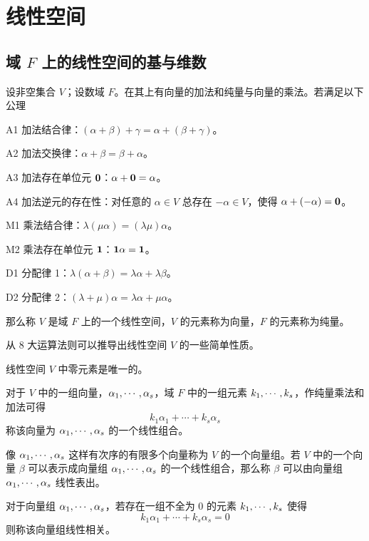 \chapter{线性空间}

\section{\texorpdfstring{域 $F$ 上的线性空间的基与维数}{域 F 上的线性空间的基与维数}}

\begin{definition}[线性空间]
	设非空集合 $V$；设数域 $F$。在其上有向量的加法和纯量与向量的乘法。若满足以下公理
	
	A1 加法结合律：$(\alpha+\beta) + \gamma = \alpha +(\beta+\gamma)$。
	
	A2 加法交换律：$\alpha + \beta = \beta + \alpha$。
	
	A3 加法存在单位元 $\boldsymbol{0}$：$\alpha + \boldsymbol{0} = \alpha$。
	
	A4 加法逆元的存在性：对任意的 $\alpha \in V$ 总存在 $-\alpha\in V$，使得 $\alpha + (-\alpha) = \boldsymbol{0}$。
	
	M1 乘法结合律：$\lambda(\mu \alpha) = (\lambda \mu) \alpha$。
	
	M2 乘法存在单位元 $\boldsymbol{1}$：$\boldsymbol{1} \alpha = \boldsymbol{1}$。
	
	D1 分配律 1：$\lambda(\alpha+\beta) = \lambda \alpha + \lambda \beta$。
	
	D2 分配律 2：$(\lambda + \mu)\alpha = \lambda \alpha + \mu \alpha$。
	
	那么称 $V$ 是域 $F$ 上的一个线性空间，$V$ 的元素称为向量，$F$ 的元素称为纯量。
\end{definition}

从 $8$ 大运算法则可以推导出线性空间 $V$ 的一些简单性质。

\begin{theorem}
	线性空间 $V$ 中零元素是唯一的。
\end{theorem}

对于 $V$ 中的一组向量，$\alpha_1,\cdots,\alpha_s$，域 $F$ 中的一组元素 $k_1,\cdots,k_s$，作纯量乘法和加法可得
\[ k_1\alpha_1+\cdots+k_s\alpha_s \]
称该向量为 $\alpha_1,\cdots,\alpha_s$ 的一个线性组合。

像 $\alpha_1,\cdots,\alpha_s$ 这样有次序的有限多个向量称为 $V$ 的一个向量组。若 $V$ 中的一个向量 $\beta$ 可以表示成向量组 $\alpha_1,\cdots,\alpha_s$ 的一个线性组合，那么称 $\beta$ 可以由向量组 $\alpha_1,\cdots,\alpha_s$ 线性表出。

\begin{definition}[线性相关]
	对于向量组 $\alpha_1,\cdots,\alpha_s$，若存在一组不全为 $0$ 的元素 $k_1,\cdots,k_s$ 使得
	\[ k_1\alpha_1 + \cdots + k_s\alpha_s = 0 \]
	则称该向量组线性相关。
\end{definition}

